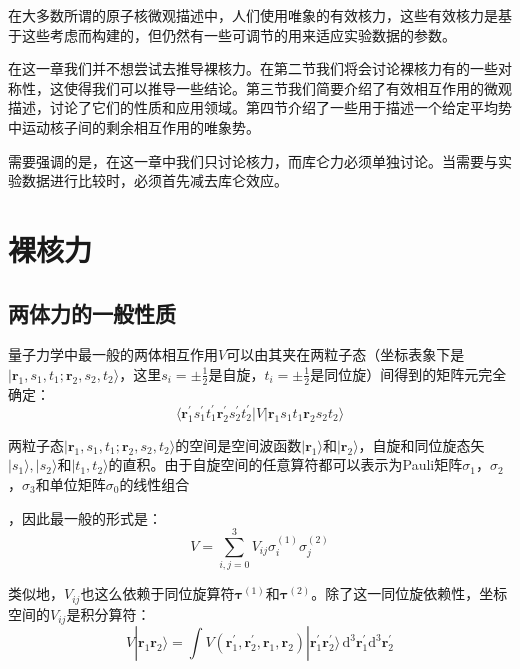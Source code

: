 在大多数所谓的原子核微观描述中，人们使用唯象的有效核力，这些有效核力是基于这些考虑而构建的，但仍然有一些可调节的用来适应实验数据的参数。

在这一章我们并不想尝试去推导裸核力\cite{BJ76a}。在第二节我们将会讨论裸核力有的一些对称性，这使得我们可以推导一些结论。第三节我们简要介绍了有效相互作用的微观描述，讨论了它们的性质和应用领域。第四节介绍了一些用于描述一个给定平均势中运动核子间的剩余相互作用的唯象势。

需要强调的是，在这一章中我们只讨论核力，而库仑力必须单独讨论。当需要与实验数据进行比较时，必须首先减去库仑效应。

\section{裸核力\label{sec:=0088F8=006838=00529B}}

\subsection{两体力的一般性质}

量子力学中最一般的两体相互作用$V$可以由其夹在两粒子态（坐标表象下是$|\boldsymbol{r}_{1},s_{1},t_{1};\boldsymbol{r}_{2},s_{2},t_{2}\rangle$，这里$s_{i}=\pm\frac{1}{2}$是自旋，$t_{i}=\pm\frac{1}{2}$是同位旋）间得到的矩阵元完全确定：
\[
\langle\boldsymbol{r}^{\prime}_{1}s^{\prime}_{1}t^{\prime}_{1}\boldsymbol{r}^{\prime}_{2}s^{\prime}_{2}t^{\prime}_{2}|V|\boldsymbol{r}_{1}s_{1}t_{1}\boldsymbol{r}_{2}s_{2}t_{2}\rangle
\]

两粒子态$|\boldsymbol{r}_{1},s_{1},t_{1};\boldsymbol{r}_{2},s_{2},t_{2}\rangle$的空间是空间波函数$|\boldsymbol{r}_{1}\rangle$和$|\boldsymbol{r}_{2}\rangle$，自旋和同位旋态矢$|s_{1}\rangle,|s_{2}\rangle$和$|t_{1},t_{2}\rangle$的直积。由于自旋空间的任意算符都可以表示为Pauli矩阵$\sigma_{1}$，$\sigma_{2}$，$\sigma_{3}$和单位矩阵$\sigma_{0}$的线性组合

，因此最一般的形式是：
\begin{equation}
V=\sum^{3}_{i,j=0}V_{ij}\sigma^{(1)}_{i}\sigma^{(2)}_{j}\label{eq:general V in spin space}
\end{equation}

类似地，$V_{ij}$也这么依赖于同位旋算符$\boldsymbol{\tau}^{(1)}$和$\boldsymbol{\tau}^{(2)}$。除了这一同位旋依赖性，坐标空间的$V_{ij}$是积分算符：
\begin{equation}
V|\boldsymbol{r}_{1}\boldsymbol{r}_{2}\rangle=\int V(\boldsymbol{r}^{\prime}_{1},\boldsymbol{r}^{\prime}_{2},\boldsymbol{r}_{1},\boldsymbol{r}_{2})|\boldsymbol{r}^{\prime}_{1}\boldsymbol{r}^{\prime}_{2}\rangle\,\mathrm{d}^{3}\boldsymbol{r}^{\prime}_{1}\mathrm{d}^{3}\boldsymbol{r}^{\prime}_{2}\label{eq:V in coordinate space}
\end{equation}


